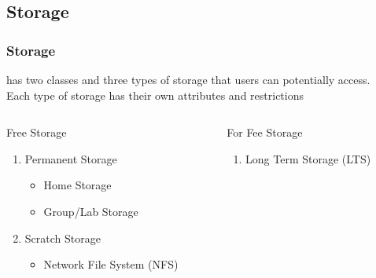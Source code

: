 \subsection{Storage}
\begin{frame}
  \frametitle{Storage}
  {\mana} has two classes and three types of storage that users can potentially access.\\Each type of storage has their own attributes and restrictions
	\begin{columns}
		\begin{column}{0.46\textwidth}
		\begin{block}{Free Storage}
			\begin{enumerate}
			\item Permanent Storage
				\begin{itemize}
				\item Home Storage
				\item Group/Lab Storage
				\end{itemize}
			\item Scratch Storage
				\begin{itemize}
				\item Network File System (NFS)
				\end{itemize}
		\end{enumerate}
		\end{block}
		\end{column}
		\begin{column}{0.46\textwidth}
		\begin{block}{For Fee Storage}
			\begin{enumerate}
				\item Long Term Storage (LTS)
		\end{enumerate}
		\end{block}
		\end{column}
	\end{columns}      
\end{frame}

